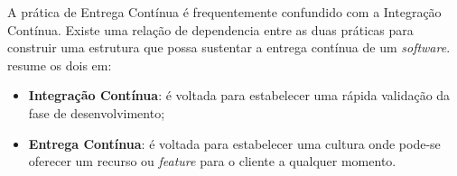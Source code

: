 A prática de Entrega Contínua  é frequentemente confundido com a Integração
Contínua. Existe uma relação de dependencia entre as duas práticas para
construir uma estrutura que possa sustentar a entrega contínua de um
\textit{software}.~ resume os dois em:

\begin{itemize}
  \item \textbf{Integração Contínua}: é voltada para estabelecer uma rápida
    validação da fase de desenvolvimento;
  \item \textbf{Entrega Contínua}: é voltada para estabelecer uma cultura onde
    pode-se oferecer um recurso ou \textit{feature} para o cliente a qualquer
    momento.
\end{itemize}

